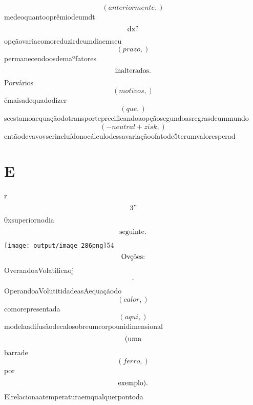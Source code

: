 \documentclass{article}
\begin{document}
\begin{equation}
\left( anteriormente,\right)
\end{equation}medeoquantooprêmiodeumdt\begin{equation}
$dx?$
\end{equation}opçãovariacomoreduzirdeumdiaemseu\begin{equation}
\left( prazo,\right)
\end{equation}permanecendoosdemaºfatores\begin{equation}
$inalterados.$
\end{equation}Porvários\begin{equation}
\left( motivos,\right)
\end{equation}émaisadequadodizer\begin{equation}
\left( que,\right)
\end{equation}seestamoaequaçãodotransporteprecificandoaopçãosegundoasregrasdeummundo\begin{equation}
\left( - neutral + zisk,\right)
\end{equation}entãodevavovserincluídonocálculodessavariaçãoofatode5terumvaloresperad\section{E}r\begin{equation}
$3”$
\end{equation}0xsuperiornodia\begin{equation}
$seguinte.$
\end{equation}\texttt{[image: output/image\_286png]}54\begin{equation}
$Ovções:$
\end{equation}OverandoaVolatilicnoj\begin{equation}
$-$
\end{equation}OperandoaVolutitidadeasAequaçãodo\begin{equation}
\left( calor,\right)
\end{equation}comorepresentada\begin{equation}
\left( aqui,\right)
\end{equation}modelaadifusãodecalosobreumcorpounidimensional\begin{equation}
$(uma$
\end{equation}barrade\begin{equation}
\left( ferro,\right)
\end{equation}por\begin{equation}
$exemplo).$
\end{equation}Elrelacionaatemperaturaemqualquerpontoda\begin{equation}

\end{equation}
\end{document}

